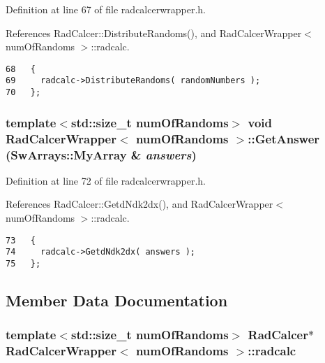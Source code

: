 Definition at line 67 of file radcalcerwrapper.h.

References RadCalcer::DistributeRandoms(), and RadCalcerWrapper$<$ numOfRandoms $>$::radcalc.

\begin{Code}\begin{verbatim}68   {
69     radcalc->DistributeRandoms( randomNumbers );
70   };
\end{verbatim}
\end{Code}


\subsubsection{\setlength{\rightskip}{0pt plus 5cm}template$<$std::size\_\-t numOfRandoms$>$ void {\bf RadCalcerWrapper}$<$ numOfRandoms $>$::GetAnswer ({\bf SwArrays::MyArray} \& {\em answers})\hspace{0.3cm}{\tt  [inline]}}\label{classRadCalcerWrapper_c07c6df06199a7e65969f9a47ca5e813}




Definition at line 72 of file radcalcerwrapper.h.

References RadCalcer::GetdNdk2dx(), and RadCalcerWrapper$<$ numOfRandoms $>$::radcalc.

\begin{Code}\begin{verbatim}73   {
74     radcalc->GetdNdk2dx( answers );
75   };
\end{verbatim}
\end{Code}




\subsection{Member Data Documentation}
\subsubsection{\setlength{\rightskip}{0pt plus 5cm}template$<$std::size\_\-t numOfRandoms$>$ {\bf RadCalcer}$\ast$ {\bf RadCalcerWrapper}$<$ numOfRandoms $>$::{\bf radcalc}\hspace{0.3cm}{\tt  [private]}}\label{classRadCalcerWrapper_34c16c4a37e0d7c896be0a800d744e62}




